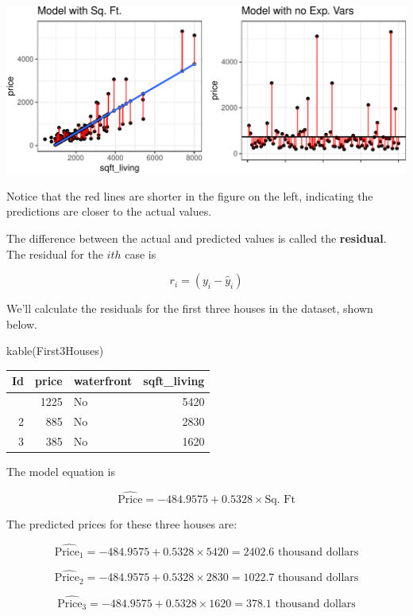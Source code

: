 \documentclass[
  letterpaper,
  DIV=11,
  numbers=noendperiod]{scrreprt}
\newenvironment{Shaded}{\begin{snugshade}}{\end{snugshade}}
\newcommand{\FunctionTok}[1]{\textcolor[rgb]{0.28,0.35,0.67}{#1}}
\newcommand{\NormalTok}[1]{\textcolor[rgb]{0.00,0.23,0.31}{#1}}
\begin{document}
\includegraphics{Ch2_files/figure-pdf/unnamed-chunk-23-1.pdf}

Notice that the red lines are shorter in the figure on the left,
indicating the predictions are closer to the actual values.

The difference between the actual and predicted values is called the
\textbf{residual}. The residual for the \(ith\) case is

\[
r_i = (y_i-\hat{y}_i)
\]

We'll calculate the residuals for the first three houses in the dataset,
shown below.

\begin{Shaded}
\begin{Highlighting}[]
\FunctionTok{kable}\NormalTok{(First3Houses)}
\end{Highlighting}
\end{Shaded}

\begin{longtable}[]{@{}rrlr@{}}
\toprule\noalign{}
Id & price & waterfront & sqft\_living \\
\midrule\noalign{}
\endhead
\bottomrule\noalign{}
\endlastfoot
1 & 1225 & No & 5420 \\
2 & 885 & No & 2830 \\
3 & 385 & No & 1620 \\
\end{longtable}

The model equation is

\[
\widehat{\text{Price}} = -484.9575 + 0.5328\times \text{Sq. Ft} 
\]

The predicted prices for these three houses are:

\[
\widehat{\text{Price}_1} = -484.9575 + 0.5328\times 5420 = 2402.6 \text{ thousand dollars}
\]

\[
\widehat{\text{Price}_2} = -484.9575 + 0.5328\times 2830 = 1022.7 \text{ thousand dollars}
\]

\[
\widehat{\text{Price}_3} = -484.9575 + 0.5328\times 1620 = 378.1 \text{ thousand dollars}
\]
\end{document}
